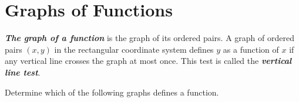 \documentclass[en,11pt]{elegantbook}
\let\BeginKnitrBlock\begin \let\EndKnitrBlock\end
\begin{document}
\hypertarget{graphs-of-functions}{%
\section{Graphs of Functions}\label{graphs-of-functions}}

\textbf{\emph{The graph of a function}} is the graph of its ordered pairs. A graph of ordered pairs \((x,y)\) in the rectangular coordinate system defines \(y\) as a function of \(x\) if any vertical line crosses the graph at most once. This test is called the \textbf{\emph{vertical line test}}.

\BeginKnitrBlock{example}
\protect\hypertarget{exm:unnamed-chunk-220}{}{\label{exm:unnamed-chunk-220} }
Determine which of the following graphs defines a function.
\EndKnitrBlock{example}

\begin{figure}

{\centering {}

}

\caption{ }\label{fig:fig-ABCD-LaTeX}
\end{figure}
\end{document}
